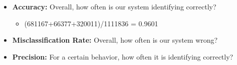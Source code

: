 \begin{itemize}
	\item \textbf{Accuracy:} Overall, how often is our system identifying correctly?
	\begin{itemize}
		
		\item (681167+66377+320011)/1111836 = 0.9601
		
	\end{itemize}
	
	\item \textbf{Misclassification Rate:} Overall, how often is our system wrong?
	\begin{itemize}
		
	
	\end{itemize}
	
	\item \textbf{Precision:} For a certain behavior, how often it is identifying correctly?
	\begin{itemize}
		
		
		
	\end{itemize}
	
\end{itemize}